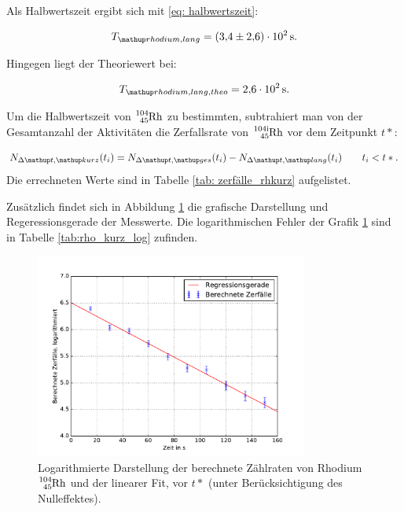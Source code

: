 Als Halbwertszeit ergibt sich mit \eqref{eq: halbwertszeit}:

\begin{equation}
  \label{eq:halbwertzeit_rhodium}
  T\ua{rhodium, lang}=\SI{3.4\pm2.6 e+2}{\second}.
\end{equation}

Hingegen liegt der Theoriewert\cite{rhodium_lang_halb} bei:

\begin{equation}
  \label{eq:halbwertzeit_rhodium_theo}
  T\ua{rhodium, lang, theo}=\SI{2.6 e+2}{\second}.
\end{equation}


Um die Halbwertszeit von $\ce{^{104}_{45} Rh}$ zu bestimmten, subtrahiert man von der
Gesamtanzahl der Aktivitäten die Zerfallsrate von $\ce{^{104i}_{45} Rh}$ vor dem
Zeitpunkt $t*$:

\begin{equation*}
  N_{\Delta \map{t}, \map{kurz}}(t_i)=N_{\Delta \map{t}, \map{ges}}(t_i)-N_{\Delta \map{t}, \map{lang}}(t_i) \qquad t_i<t*.
\end{equation*}
Die errechneten Werte sind in Tabelle \ref{tab: zerfälle_rhkurz} aufgelistet.


Zusätzlich findet sich in Abbildung \ref{fig: plot_rhodium_kurz} die grafische Darstellung
und Regeressionsgerade der Messwerte. Die logarithmischen Fehler der Grafik \ref{fig: plot_rhodium_kurz}
sind in Tabelle \ref{tab:rho_kurz_log} zufinden.


\begin{figure}
  \centering
  \includegraphics[width=0.8\textwidth]{pics/rhodium_kurz_berechnet.pdf}
  \caption{Logarithmierte Darstellung der berechnete Zählraten von Rhodium $\ce{^{104}_{45} Rh}$ und der linearer Fit, vor $t*$ (unter Berücksichtigung des Nulleffektes).}
  \label{fig: plot_rhodium_kurz}
\end{figure}


